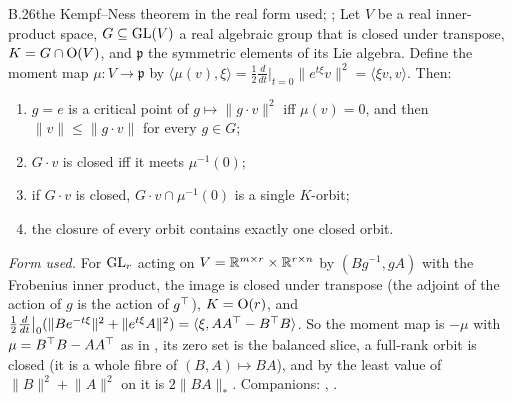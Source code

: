\begin{auxresult}{B.26}{the Kempf--Ness theorem in the real form used}{\citep{xkempf1979length};
\citep{xrichardson1990minimum}; \citep{xbirkes1971orbits}}
Let $V$ be a real inner-product space, $G\subseteq\mathrm{GL}(V)$ a real algebraic group that is closed under transpose,
$K=G\cap\mathrm{O}(V)$, and $\mathfrak p$ the symmetric elements of its Lie algebra. Define the moment map $\mu:V\to\mathfrak p$
by $\langle\mu(v),\xi\rangle=\tfrac12\tfrac{d}{dt}\big|_{t=0}\lVert e^{t\xi}v\rVert^2=\langle\xi v,v\rangle$. Then:
\begin{enumerate}[label=(\roman*)]
  \item $g=e$ is a critical point of $g\mapsto\lVert g\cdot v\rVert^2$ iff $\mu(v)=0$, and then $\lVert v\rVert\le
    \lVert g\cdot v\rVert$ for every $g\in G$;
  \item $G\cdot v$ is closed iff it meets $\mu^{-1}(0)$;
  \item if $G\cdot v$ is closed, $G\cdot v\cap\mu^{-1}(0)$ is a single $K$-orbit;
  \item the closure of every orbit contains exactly one closed orbit.
\end{enumerate}
\end{auxresult}
\noindent\emph{Form used.} For $\mathrm{GL}_r$ acting on $V=\mathbb{R}^{m\times r}\times\mathbb{R}^{r\times n}$ by $(Bg^{-1},gA)$ with the
Frobenius inner product, the image is closed under transpose (the adjoint of the action of $g$ is the action of
$g^{\top}$), $K=\mathrm{O}(r)$, and $\tfrac12\tfrac{d}{dt}\big|_0(\lVert Be^{-t\xi}\rVert^2+\lVert e^{t\xi}A\rVert^2)=
\langle\xi,AA^{\top}-B^{\top} B\rangle$. So the moment map is $-\mu$ with $\mu=B^{\top} B-AA^{\top}$ as in , its
zero set is the balanced slice, a full-rank orbit is closed (it is a whole fibre of $(B,A)\mapsto BA$), and by
 the least value of $\lVert B\rVert^2+\lVert A\rVert^2$ on it is $2\lVert BA\rVert_*$. Companions:
, .


